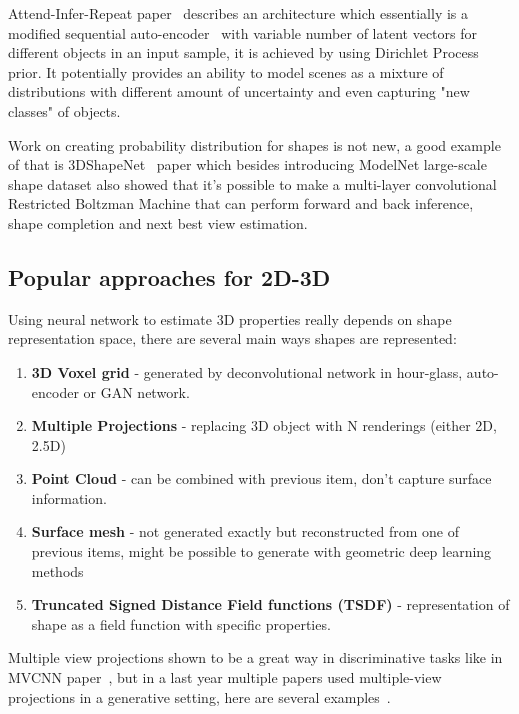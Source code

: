 Attend-Infer-Repeat paper~\cite{eslami2016attend} describes an architecture which essentially is a modified sequential auto-encoder~\cite{gregor2015draw} with variable number of latent vectors for different objects in an input sample, it is achieved by using Dirichlet Process prior. It potentially provides an ability to model scenes as a mixture of distributions with different amount of uncertainty and even capturing "new classes" of objects.

Work on creating probability distribution for shapes is not new, a good example of that is 3DShapeNet~\cite{wu20153d} paper which besides introducing ModelNet large-scale shape dataset also showed that it's possible to make a multi-layer convolutional Restricted Boltzman Machine that can perform forward and back inference, shape completion and next best view estimation.

\subsection{Popular approaches for 2D-3D}
\label{sec:approaches}

Using neural network to estimate 3D properties really depends on shape representation space, there are several main ways shapes are represented:

\begin{enumerate}
    \item \textbf{3D Voxel grid} - generated by deconvolutional network in hour-glass, auto-encoder or GAN network.
    \item \textbf{Multiple Projections} - replacing 3D object with N renderings (either 2D, 2.5D)
    \item \textbf{Point Cloud} - can be combined with previous item, don't capture surface information.
    \item \textbf{Surface mesh} - not generated exactly but reconstructed from one of previous items, might be possible to generate with geometric deep learning methods
    \item \textbf{Truncated Signed Distance Field functions (TSDF)} - representation of shape as a field function with specific properties.
\end{enumerate}

Multiple view projections shown to be a great way in discriminative tasks like in MVCNN paper~\cite{su15mvcnn}, but in a last year multiple papers used multiple-view projections in a generative setting, here are several examples~\cite{Soltani_2017_CVPR,girdhar2016learning,lin2017learning,Ulusoy_2017_CVPR,tatarchenko2016multi}.

